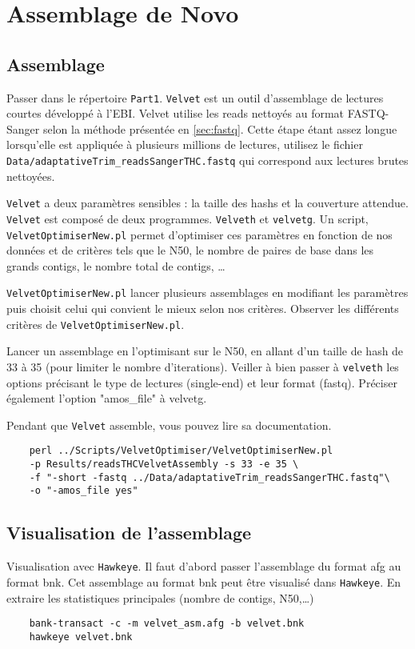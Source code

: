 \documentclass[a4paper,12pt]{article}
\begin{document}
\section{Assemblage de Novo}
\label{sec:assd}
\subsection{Assemblage}
Passer dans le répertoire \verb=Part1=. \verb=Velvet= est un outil d'assemblage de lectures courtes développé à l'EBI. Velvet utilise les reads nettoyés au format FASTQ-Sanger selon la méthode présentée en \ref{sec:fastq}. Cette étape étant assez longue lorsqu'elle est appliquée à plusieurs millions de lectures, utilisez le fichier \verb=Data/adaptativeTrim_readsSangerTHC.fastq= qui correspond aux lectures brutes nettoyées.

\verb=Velvet= a deux paramètres sensibles : la taille des hashs et la couverture attendue. \verb=Velvet= est composé de deux programmes. \verb=Velveth= et \verb=velvetg=.
Un script, \verb=VelvetOptimiserNew.pl= permet d'optimiser ces paramètres en fonction de nos données et de critères tels que le N50, le nombre de paires de base dans les grands contigs, le nombre total de contigs, \ldots

\verb=VelvetOptimiserNew.pl= lancer plusieurs assemblages en modifiant les paramètres puis choisit celui qui convient le mieux selon nos critères.
Observer les différents critères de \verb=VelvetOptimiserNew.pl=.

Lancer un assemblage en l'optimisant sur le N50, en allant d'un taille de hash de 33 à 35 (pour limiter le nombre d'iterations). Veiller à bien passer à \verb=velveth= les options précisant le type de lectures (single-end) et leur format (fastq). Préciser également l'option "amos\_file" à velvetg.

Pendant que \verb=Velvet= assemble, vous pouvez lire sa documentation.


\begin{lstlisting}	
	perl ../Scripts/VelvetOptimiser/VelvetOptimiserNew.pl 
	-p Results/readsTHCVelvetAssembly -s 33 -e 35 \
	-f "-short -fastq ../Data/adaptativeTrim_readsSangerTHC.fastq"\
	-o "-amos_file yes"
\end{lstlisting}	


\subsection{Visualisation de l'assemblage}

Visualisation avec \verb=Hawkeye=. Il faut d'abord passer l'assemblage du format afg au format bnk. Cet assemblage au format bnk peut être visualisé dans \verb=Hawkeye=. En extraire les statistiques principales (nombre de contigs, N50,\ldots) 
\begin{lstlisting}	
	bank-transact -c -m velvet_asm.afg -b velvet.bnk
	hawkeye velvet.bnk
\end{lstlisting}
\end{document}
